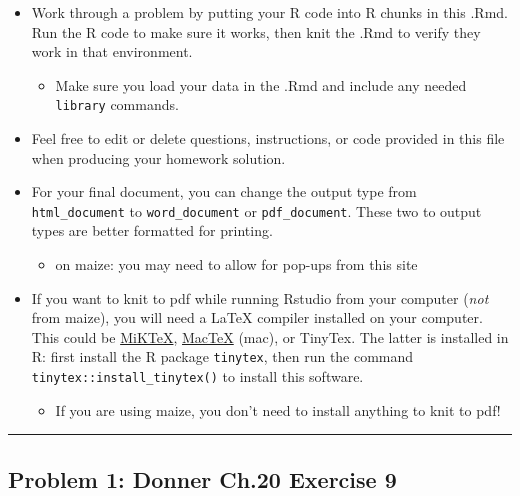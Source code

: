 \documentclass[
]{article}
\providecommand{\tightlist}{%
  \setlength{\itemsep}{0pt}\setlength{\parskip}{0pt}}
\begin{document}
\begin{itemize}
\tightlist
\item
  Work through a problem by putting your R code into R chunks in this
  .Rmd. Run the R code to make sure it works, then knit the .Rmd to
  verify they work in that environment.

  \begin{itemize}
  \tightlist
  \item
    Make sure you load your data in the .Rmd and include any needed
    \texttt{library} commands.
  \end{itemize}
\item
  Feel free to edit or delete questions, instructions, or code provided
  in this file when producing your homework solution.
\item
  For your final document, you can change the output type from
  \texttt{html\_document} to \texttt{word\_document} or
  \texttt{pdf\_document}. These two to output types are better formatted
  for printing.

  \begin{itemize}
  \tightlist
  \item
    on maize: you may need to allow for pop-ups from this site
  \end{itemize}
\item
  If you want to knit to pdf while running Rstudio from your computer
  (\emph{not} from maize), you will need a LaTeX compiler installed on
  your computer. This could be \href{https://miktex.org/}{MiKTeX},
  \href{http://www.tug.org/mactex/}{MacTeX} (mac), or TinyTex. The
  latter is installed in R: first install the R package
  \texttt{tinytex}, then run the command
  \texttt{tinytex::install\_tinytex()} to install this software.

  \begin{itemize}
  \tightlist
  \item
    If you are using maize, you don't need to install anything to knit
    to pdf!
  \end{itemize}
\end{itemize}

\begin{center}\rule{0.5\linewidth}{0.5pt}\end{center}

\hypertarget{problem-1-donner-ch.20-exercise-9}{%
\subsection{Problem 1: Donner Ch.20 Exercise
9}\label{problem-1-donner-ch.20-exercise-9}}
\end{document}
